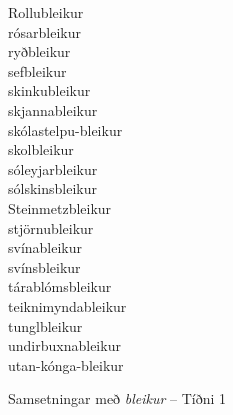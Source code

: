 \documentclass[../samsetningasafn.tex]{subfiles}
\begin{document}
\begin{bigwordlist}
\begin{center}
\begin{footnotesize}
\begin{multicols}{4}
\begin{description}
		\item [Rollubleikur]
		\item [rósarbleikur]
		\item [ryðbleikur]
		\item [sefbleikur]
		\item [skinkubleikur]
		\item [skjannableikur]
		\item [skólastelpu-bleikur]
		\item [skolbleikur]
		\item [sóleyjarbleikur]
		\item [sólskinsbleikur]
		\item [Steinmetzbleikur]
		\item [stjörnubleikur]
		\item [svínableikur]
		\item [svínsbleikur]
		\item [tárablómsbleikur]
		\item [teiknimyndableikur]
		\item [tunglbleikur]
		\item [undirbuxnableikur]
		\item [utan-kónga-bleikur]
	\end{description}
\end{multicols}
\end{footnotesize}
\end{center}

\label{listi:bleikur1}
\caption{Samsetningar með \textit{bleikur} -- Tíðni 1}

\end{bigwordlist}
\end{document}
